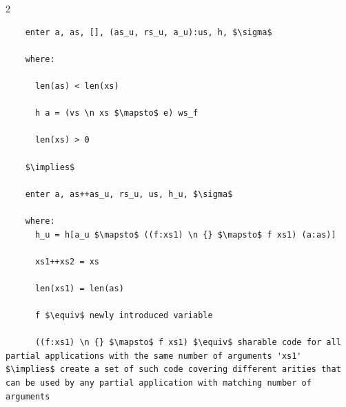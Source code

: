 \documentclass[8pt]{extarticle}
\begin{document}
\begin{multicols*}{2}
  \begin{lstlisting}
    enter a, as, [], (as_u, rs_u, a_u):us, h, $\sigma$

    where:

      len(as) < len(xs)

      h a = (vs \n xs $\mapsto$ e) ws_f

      len(xs) > 0

    $\implies$

    enter a, as++as_u, rs_u, us, h_u, $\sigma$

    where:
      h_u = h[a_u $\mapsto$ ((f:xs1) \n {} $\mapsto$ f xs1) (a:as)]

      xs1++xs2 = xs

      len(xs1) = len(as)

      f $\equiv$ newly introduced variable

      ((f:xs1) \n {} $\mapsto$ f xs1) $\equiv$ sharable code for all partial applications with the same number of arguments 'xs1' $\implies$ create a set of such code covering different arities that can be used by any partial application with matching number of arguments
  \end{lstlisting}

  \vfill\null
  \columnbreak



    
\end{multicols*}
\end{document}

